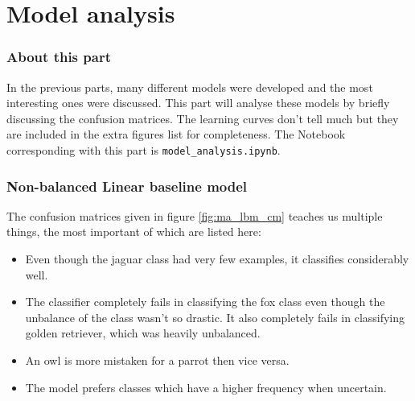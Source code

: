 \part{Model analysis}
\label{part:model_anal}


\section{About this part}
\label{section:ma_about_part}

In the previous parts, many different models were developed and the most interesting ones were discussed.
This part will analyse these models by briefly discussing the confusion matrices.
The learning curves don't tell much but they are included in the extra figures list for completeness.
The Notebook corresponding with this part is \texttt{model\_analysis.ipynb}.


\section{Non-balanced Linear baseline model}
\label{section:ma_lbm_nonb}

The confusion matrices given in figure \ref{fig:ma_lbm_cm} teaches us multiple things, the most important of which are listed here:
\begin{itemize}
    \item Even though the jaguar class had very few examples, it classifies considerably well.
    \item The classifier completely fails in classifying the fox class even though the unbalance of the class wasn't so drastic. It also completely fails in classifying golden retriever, which was heavily unbalanced.
    \item An owl is more mistaken for a parrot then vice versa. 
    \item The model prefers classes which have a higher frequency when uncertain.
\end{itemize}

